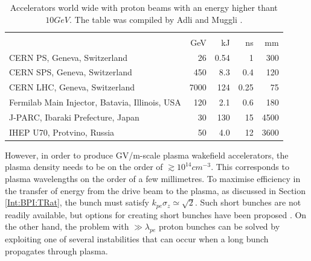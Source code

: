 \begin{table}[hbt]
    \centering
    \caption{Accelerators world wide with proton beams with an energy higher thant $10\unit{GeV}$. The table was compiled by Adli and Muggli \cite{adli:2016b}.}
    \label{T:ProtonBeams}
    \begin{tabularx}{\textwidth}{X d{1} d{1} d{1} d{1}}
            &  &  \\
            & \unit{GeV} & \unit{kJ} & \unit{ns} & \unit{mm} \\
        \hline
        CERN PS, Geneva, Switzerland \cite{assmann:2009}
            &   26 &   0.54 &  1    &  300 \\
        CERN SPS, Geneva, Switzerland \cite{assmann:2009}
            &  450 &   8.3  &  0.4  &  120 \\
        CERN LHC, Geneva, Switzerland \cite{assmann:2009}
            & 7000 & 124    &  0.25 &   75 \\
        Fermilab Main Injector, Batavia, Illinois, USA \cite{nagaitsev:2014}
            &  120 &   2.1  &  0.6  &  180 \\
        J-PARC, Ibaraki Prefecture, Japan \cite{hotchi:2012}
            &   30 & 130    & 15    & 4500 \\
        IHEP U70, Protvino, Russia \cite{ivanov:2014}
            &   50 &   4.0  & 12    & 3600 \\
        \hline
    \end{tabularx}
\end{table}

However, in order to produce GV/m-scale plasma wakefield accelerators, the plasma density needs to be on the order of $\gtrsim 10^{14}\unit{cm}^{-3}$. This corresponds to plasma wavelengths on the order of a few millimetres. To maximise efficiency in the transfer of energy from the drive beam to the plasma, as discussed in Section \ref{Int:BPI:TRat}, the bunch must satisfy $k_{pe}\sigma_{z} \simeq \sqrt{2}$. Such short bunches are not readily available, but options for creating short bunches have been proposed \cite{assmann:2009}. On the other hand, the problem with $\gg\lambda_{pe}$ proton bunches can be solved by exploiting one of several instabilities that can occur when a long bunch propagates through plasma.

